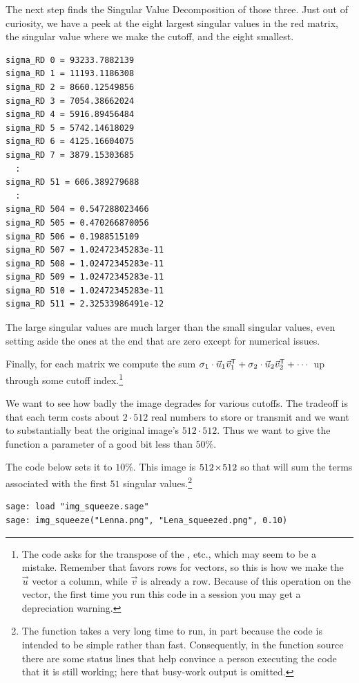 The next step finds the Singular Value Decomposition of those three.
Just out of curiosity, we have a peek at the eight largest singular
values in the red matrix, the singular value where we make the cutoff,
and the eight smallest.
\begin{lstlisting}
sigma_RD 0 = 93233.7882139
sigma_RD 1 = 11193.1186308
sigma_RD 2 = 8660.12549856
sigma_RD 3 = 7054.38662024
sigma_RD 4 = 5916.89456484
sigma_RD 5 = 5742.14618029
sigma_RD 6 = 4125.16604075
sigma_RD 7 = 3879.15303685
  :
sigma_RD 51 = 606.389279688
  :
sigma_RD 504 = 0.547288023466
sigma_RD 505 = 0.470266870056
sigma_RD 506 = 0.1988515109
sigma_RD 507 = 1.02472345283e-11
sigma_RD 508 = 1.02472345283e-11
sigma_RD 509 = 1.02472345283e-11
sigma_RD 510 = 1.02472345283e-11
sigma_RD 511 = 2.32533986491e-12  
\end{lstlisting}
The large singular values are much larger than the small singular values,
even setting aside the ones at the end
that are zero except for numerical issues.

Finally, for each matrix we compute the sum
$\sigma_1\cdot\vec{u}_1{{\vec{v}}^{\textsf{T}}}_1+\sigma_2\cdot\vec{u}_2{{\vec{v}}^{\textsf{T}}}_2
   +\cdots$
up through some cutoff index.\footnote{The code asks for the transpose of the
\protect{}, etc., which may seem to be a mistake.
Remember that \protect\Sage{} favors rows for vectors, so this is how we
make the $\vec{u}$ vector a column, while $\vec{v}$ is already a row.
Because of this operation on the vector, the first time you run this
code in a \protect\Sage{} session you may get a depreciation warning.}

We want to see how badly the image degrades for various cutoffs.
The tradeoff is that each term costs about $2\cdot 512$ real numbers to store
or transmit and we want to substantially 
beat the original image's $512\cdot 512$.
Thus we want to give the function a parameter of a good bit 
less than $50\%$.

The code below sets it to $10\%$.
This image is $512 \! \times \! 512$  so that will sum the terms associated
with the first $51$ singular 
values.\footnote{The function takes a very long time to run, in part because
the code is intended to be simple rather than fast.
Consequently, in the function source there are some status lines that
help convince a person executing the code that it is still working; here
that busy-work output is omitted.}  
\begin{lstlisting}
sage: load "img_squeeze.sage"                                 
sage: img_squeeze("Lenna.png", "Lena_squeezed.png", 0.10)
\end{lstlisting}

